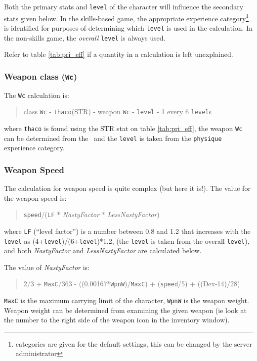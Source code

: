 Both the primary stats and {\tt level} of the character will influence 
the secondary stats given below. In the skills-based game, the 
appropriate experience category\footnote{categories
are given for the default settings, this can be changed by the 
server administrator} is identified for purposes of determining 
which {\tt level} is used in the calculation. In the non-skills
game, the {\em overall} {\tt level} is always used.

Refer to table \ref{tab:pri_eff} if a quantity in a calculation is
left unexplained. 

\subsubsection{Weapon class ({\tt Wc})} 
The {\tt Wc} calculation is:
\begin{quote}
class {\tt Wc} - {\tt thaco}(STR) - weapon {\tt Wc} - {\tt level} - 1 every 6 {\tt level}s  
\end{quote}
where {\tt thaco} is found using the STR stat on table \ref{tab:pri_eff}, 
the weapon {\tt Wc} 
can be determined from the \spoiler\ and the {\tt level} is taken from the 
{\tt physique} experience category. 

\subsubsection{Weapon Speed} 
The calculation for weapon speed is quite complex (but here it is!).
The value for the weapon speed is:
\begin{quote}
{\tt speed}/({\tt LF} * {\sl NastyFactor} * {\sl LessNastyFactor})
\end{quote}
where {\tt LF} (``level factor'') is a number between 0.8 and 1.2 that 
increases with the {\tt level} as (4+{\tt level})/(6+{\tt level})*1.2,
(the {\tt level} is taken from the overall {\tt level}),
and both {\sl NastyFactor} and {\sl LessNastyFactor} are calculated below.

The value of {\sl NastyFactor} is:
{\small
\begin{quote} 
2/3 + {\tt MaxC}/363 - ((0.00167*{\tt WpnW})/{\tt MaxC}) + ({\tt speed}/5) + ((Dex-14)/28) 
\end{quote}
}
 {\tt MaxC} is the maximum carrying 
limit of the character, {\tt WpnW} is 
the weapon weight. Weapon weight can be determined from examining the given 
weapon (ie look at the number to the right side of the weapon icon in the 
inventory window).

